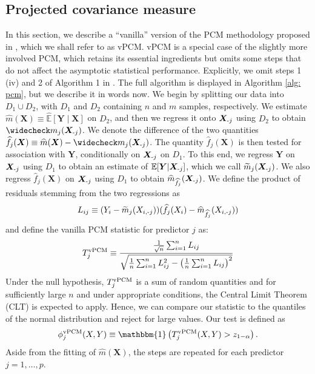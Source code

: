 \documentclass[12pt]{article}
\theoremstyle{definition}
\theoremstyle{remark}
\newcommand{\E}{\mathbb E}								%
\newcommand{\prx}{\bm X}								%
\newcommand{\srx}{X}									%
\newcommand{\pry}{{\bm Y}}								%
\newcommand{\sry}{Y}									%
\newcommand{\minus}{\textnormal{-}} 						    %
\begin{document}
\subsection{Projected covariance measure}\label{sec:vPCM}
In this section, we describe a ``vanilla'' version of the PCM methodology proposed in \citet{Lundborg2022a}, which we shall refer to as vPCM. vPCM is a special case of the slightly more involved PCM, which retains its essential ingredients but omits some steps that do not affect the asymptotic statistical performance. Explicitly, we omit steps 1 (iv) and 2 of Algorithm 1 in \citet{Lundborg2022a}. The full algorithm is displayed in Algorithm \ref{alg: pcm}, but we describe it in words now. We begin by splitting our data into $D_1 \cup D_2$, with $D_1$ and $D_2$ containing $n$ and $m$ samples, respectively.  We estimate $\widehat m(\prx) \equiv \widehat{\E}[\pry \mid \prx]$ on $D_2$, and then we regress it onto $\prx_{\minus j}$ using $D_2$ to obtain $\widecheck m_j(\prx_{\minus j})$. We denote the difference of the two quantities $\widehat f_j(\prx) \equiv \widehat m(\prx) - \widecheck m_j(\prx_{\minus j})$. The quantity $\widehat f_j(\prx)$ is then tested for association with $\pry$, conditionally on $\prx_{\minus j}$ on $D_1$. To this end, we regress $\pry$ on $\prx_{\minus j}$ using $D_1$ to obtain an estimate of $\E[\pry|\prx_{\minus j}]$, which we call $ \widetilde{m}_j(\prx_{\minus j})$. We also regress $\widehat f_j(\prx)$ on $\prx_{\minus j}$ using $D_1$ to obtain $\widehat m_{\widehat f_j} (\prx_{\minus j})$.  We define the product of residuals stemming from the two regressions as 
\begin{equation}
L_{ij} \equiv (\sry_i - \widetilde{m}_j(\srx_{i,\minus j}))(\widehat f_j(\srx_i) - \widehat m_{\widehat f_j} (\srx_{i,\minus j})) 
\label{eq:l-i-j}
\end{equation}
and define the vanilla PCM statistic for predictor $j$ as:
\begin{equation}
	T^{\textnormal{vPCM}}_j \equiv \frac{\frac{1}{\sqrt n} \sum_{i=1}^n L_{ij}}{\sqrt{\frac{1}{n} \sum_{i=1}^n L_{ij}^2 - \left(\frac{1}{n} \sum_{i=1}^n L_{ij}\right)^2 }}
\label{eq:vpcm-test-stat}
\end{equation}
Under the null hypothesis, $T_j^{\textnormal{vPCM}}$ is a sum of random quantities and for sufficiently large $n$ and under appropriate conditions, the Central Limit Theorem (CLT) is expected to apply. Hence, we can compare our statistic to the quantiles of the normal distribution and reject for large values.
Our test is defined as
$$
\phi_j^{\textnormal{vPCM}}(\srx,\sry) \equiv \mathbbm{1}\left(T^{\textnormal{vPCM}}_j(\srx,\sry) > z_{1-\alpha}\right).
$$
Aside from the fitting of $\widehat m(\prx)$, the steps are repeated for each predictor $j = 1,\ldots,p$.
\end{document}
